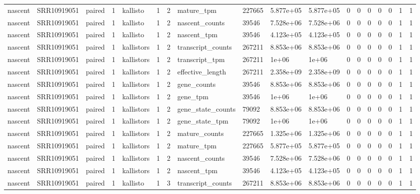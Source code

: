 \begin{tabular}{llllllllllllllllll}
nascent & SRR10919051 & paired & 1 & kallisto & 1 & 2 & mature\_tpm & 227665 & 5.877e+05 & 5.877e+05 & 0 & 0 & 0 & 0 & 0 & 1 & 1 \\
nascent & SRR10919051 & paired & 1 & kallisto & 1 & 2 & nascent\_counts & 39546 & 7.528e+06 & 7.528e+06 & 0 & 0 & 0 & 0 & 0 & 1 & 1 \\
nascent & SRR10919051 & paired & 1 & kallisto & 1 & 2 & nascent\_tpm & 39546 & 4.123e+05 & 4.123e+05 & 0 & 0 & 0 & 0 & 0 & 1 & 1 \\
nascent & SRR10919051 & paired & 1 & kallistors & 1 & 2 & transcript\_counts & 267211 & 8.853e+06 & 8.853e+06 & 0 & 0 & 0 & 0 & 0 & 1 & 1 \\
nascent & SRR10919051 & paired & 1 & kallistors & 1 & 2 & transcript\_tpm & 267211 & 1e+06 & 1e+06 & 0 & 0 & 0 & 0 & 0 & 1 & 1 \\
nascent & SRR10919051 & paired & 1 & kallistors & 1 & 2 & effective\_length & 267211 & 2.358e+09 & 2.358e+09 & 0 & 0 & 0 & 0 & 0 & 1 & 1 \\
nascent & SRR10919051 & paired & 1 & kallistors & 1 & 2 & gene\_counts & 39546 & 8.853e+06 & 8.853e+06 & 0 & 0 & 0 & 0 & 0 & 1 & 1 \\
nascent & SRR10919051 & paired & 1 & kallistors & 1 & 2 & gene\_tpm & 39546 & 1e+06 & 1e+06 & 0 & 0 & 0 & 0 & 0 & 1 & 1 \\
nascent & SRR10919051 & paired & 1 & kallistors & 1 & 2 & gene\_state\_counts & 79092 & 8.853e+06 & 8.853e+06 & 0 & 0 & 0 & 0 & 0 & 1 & 1 \\
nascent & SRR10919051 & paired & 1 & kallistors & 1 & 2 & gene\_state\_tpm & 79092 & 1e+06 & 1e+06 & 0 & 0 & 0 & 0 & 0 & 1 & 1 \\
nascent & SRR10919051 & paired & 1 & kallistors & 1 & 2 & mature\_counts & 227665 & 1.325e+06 & 1.325e+06 & 0 & 0 & 0 & 0 & 0 & 1 & 1 \\
nascent & SRR10919051 & paired & 1 & kallistors & 1 & 2 & mature\_tpm & 227665 & 5.877e+05 & 5.877e+05 & 0 & 0 & 0 & 0 & 0 & 1 & 1 \\
nascent & SRR10919051 & paired & 1 & kallistors & 1 & 2 & nascent\_counts & 39546 & 7.528e+06 & 7.528e+06 & 0 & 0 & 0 & 0 & 0 & 1 & 1 \\
nascent & SRR10919051 & paired & 1 & kallistors & 1 & 2 & nascent\_tpm & 39546 & 4.123e+05 & 4.123e+05 & 0 & 0 & 0 & 0 & 0 & 1 & 1 \\
nascent & SRR10919051 & paired & 1 & kallisto & 1 & 3 & transcript\_counts & 267211 & 8.853e+06 & 8.853e+06 & 0 & 0 & 0 & 0 & 0 & 1 & 1 \\

\end{tabular}
